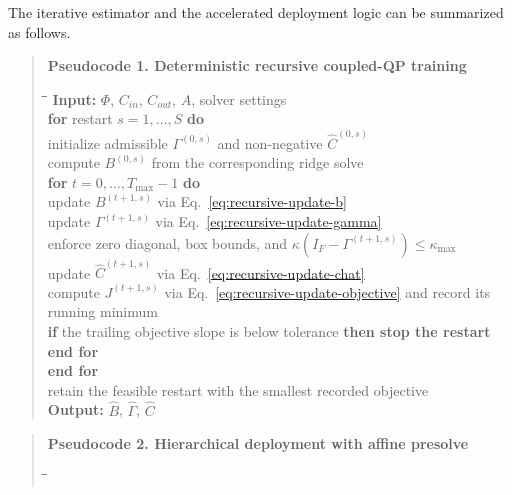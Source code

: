 \documentclass[a4paper,fleqn]{cas-sc}
\newenvironment{revblock}{\begingroup\color{revDefault}}{\endgroup}
\newenvironment{revblockr127}{\begingroup\color{revRoneTwentySeven}}{\endgroup}
\begin{document}
\begin{revblock}
\begin{revblockr127}
The iterative estimator and the accelerated deployment logic can be summarized as follows.

\noindent\begin{minipage}{\textwidth}
\begin{quote}
\noindent\textbf{Pseudocode 1. Deterministic recursive coupled-QP training}
\begin{tabbing}
\hspace{0.6cm}\=\hspace{0.6cm}\=\hspace{0.6cm}\=\kill
\textbf{Input:} $\Phi$, $C_{in}$, $C_{out}$, $A$, solver settings \\
\textbf{for} restart $s = 1, \dots, S$ \textbf{do} \\
\> initialize admissible $\Gamma^{(0,s)}$ and non-negative $\widehat{C}^{(0,s)}$ \\
\> compute $B^{(0,s)}$ from the corresponding ridge solve \\
\> \textbf{for} $t = 0, \dots, T_{\max}-1$ \textbf{do} \\
\>\> update $B^{(t+1,s)}$ via Eq.~\eqref{eq:recursive-update-b} \\
\>\> update $\Gamma^{(t+1,s)}$ via Eq.~\eqref{eq:recursive-update-gamma} \\
\>\> enforce zero diagonal, box bounds, and $\kappa(I_F - \Gamma^{(t+1,s)}) \le \kappa_{\max}$ \\
\>\> update $\widehat{C}^{(t+1,s)}$ via Eq.~\eqref{eq:recursive-update-chat} \\
\>\> compute $J^{(t+1,s)}$ via Eq.~\eqref{eq:recursive-update-objective} and record its running minimum \\
\>\> \textbf{if} the trailing objective slope is below tolerance \textbf{then stop the restart} \\
\> \textbf{end for} \\
\textbf{end for} \\
retain the feasible restart with the smallest recorded objective \\
\textbf{Output:} $\widehat{B}$, $\widehat{\Gamma}$, $\widehat{C}$
\end{tabbing}
\end{quote}
\par\medskip
\begin{quote}
\noindent\textbf{Pseudocode 2. Hierarchical deployment with affine presolve}
\begin{tabbing}
\hspace{0.6cm}\=\hspace{0.6cm}\=\hspace{0.6cm}\=\kill

\end{tabbing}
\end{quote}
\end{minipage}
\end{revblockr127}
\end{revblock}
\end{document}
